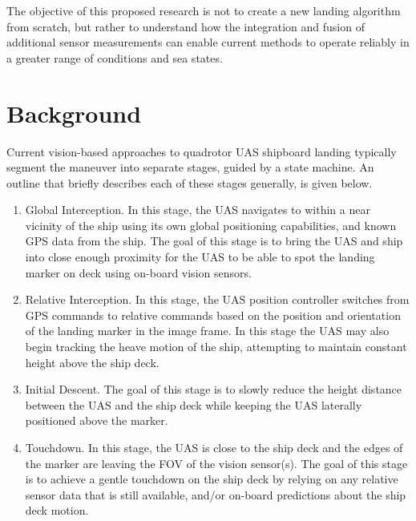 \documentclass[12pt, letterpaper]{article}
\begin{document}
The objective of this proposed research is not to create a new landing algorithm from scratch, but rather to understand how the integration and fusion of additional sensor measurements can enable current methods to operate reliably in a greater range of conditions and sea states.


\section{Background}


Current vision-based approaches to quadrotor UAS shipboard landing typically segment the maneuver into separate stages, guided by a state machine.  An outline that briefly describes each of these stages generally, is given below.   

\begin{enumerate}
\item Global Interception.  In this stage, the UAS navigates to within a near vicinity of the ship using its own global positioning capabilities, and known GPS data from the ship.  The goal of this stage is to bring the UAS and ship into close enough proximity for the UAS to be able to spot the landing marker on deck using on-board vision sensors.
\item Relative Interception.  In this stage, the UAS position controller switches from GPS commands to relative commands based on the position and orientation of the landing marker in the image frame.  In this stage the UAS may also begin tracking the heave motion of the ship, attempting to maintain constant height above the ship deck.
\item Initial Descent.  The goal of this stage is to slowly reduce the height distance between the UAS and the ship deck while keeping the UAS laterally positioned above the marker.
\item Touchdown. In this stage, the UAS is close to the ship deck and the edges of the marker are leaving the FOV of the vision sensor(s).  The goal of this stage is to achieve a gentle touchdown on the ship deck by relying on any relative sensor data that is still available, and/or on-board predictions about the ship deck motion.
\end{enumerate}
\end{document}
